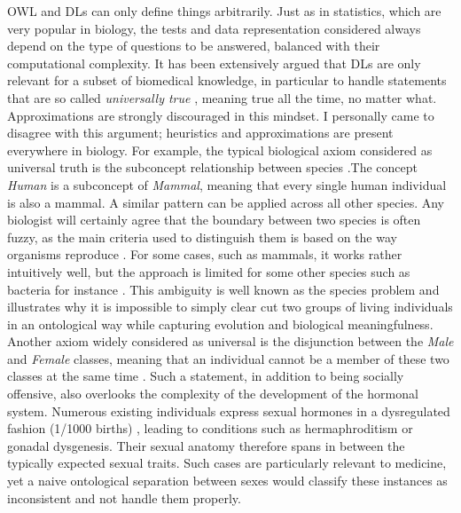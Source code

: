 OWL and DLs can only define things arbitrarily. Just as in statistics, which are very popular in biology, the tests and data representation considered always depend on the type of questions to be answered, balanced with their computational complexity. It has been extensively argued that DLs are only relevant for a subset of biomedical knowledge, in particular to handle statements that are so called \emph{universally true} \citep{schulz2013formal}, meaning true all the time, no matter what. Approximations are strongly discouraged in this mindset. I personally came to disagree with this argument; heuristics and approximations are present everywhere in biology. For example, the typical biological axiom considered as universal truth is the subconcept relationship between species \citep{schulz2013formal} \citep{krotzsch2012owl}.The concept \emph{Human} is a subconcept of \emph{Mammal}, meaning that every single human individual is also a mammal. A similar pattern can be applied across all other species. Any biologist will certainly agree that the boundary between two species is often fuzzy, as the main criteria used to distinguish them is based on the way organisms reproduce \citep{hanage2013fuzzy}. For some cases, such as mammals, it works rather intuitively well, but the approach is limited for some other species such as bacteria for instance \citep{hanage2013fuzzy}. This ambiguity is well known as the species problem and illustrates why it is impossible to simply clear cut two groups of living individuals in an ontological way while capturing evolution and biological meaningfulness. Another axiom widely considered as universal is the disjunction between the \emph{Male} and \emph{Female} classes, meaning that an individual cannot be a member of these two classes at the same time \citep{disjointw3c}. Such a statement, in addition to being socially offensive, also overlooks the complexity of the development of the hormonal system. Numerous existing individuals express sexual hormones in a dysregulated fashion (1/1000 births) \citep{dreger1998ambiguous}, leading to conditions such as hermaphroditism or gonadal dysgenesis. Their sexual anatomy therefore spans in between the typically expected sexual traits. Such cases are particularly relevant to medicine, yet a naive ontological separation between sexes would classify these instances as inconsistent and not handle them properly.

